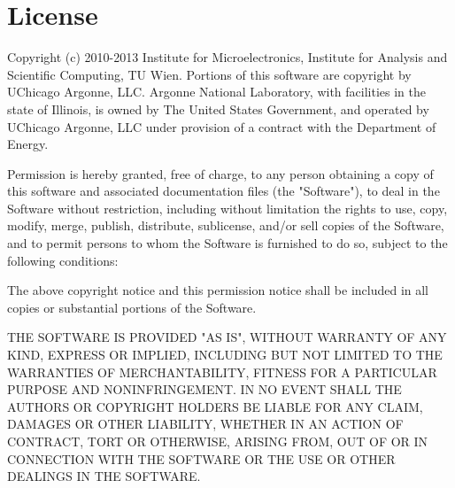 
\chapter{License} %

Copyright (c) 2010-2013 Institute for Microelectronics, Institute for Analysis and Scientific Computing, TU Wien.
Portions of this software are copyright by UChicago Argonne, LLC.
Argonne National Laboratory, with facilities in the state of Illinois,
is owned by The United States Government, and operated by UChicago Argonne, LLC
under provision of a contract with the Department of Energy.

Permission is hereby granted, free of charge, to any person obtaining a copy
of this software and associated documentation files (the "Software"), to deal
in the Software without restriction, including without limitation the rights
to use, copy, modify, merge, publish, distribute, sublicense, and/or sell
copies of the Software, and to permit persons to whom the Software is
furnished to do so, subject to the following conditions:

The above copyright notice and this permission notice shall be included in
all copies or substantial portions of the Software.

THE SOFTWARE IS PROVIDED "AS IS", WITHOUT WARRANTY OF ANY KIND, EXPRESS OR
IMPLIED, INCLUDING BUT NOT LIMITED TO THE WARRANTIES OF MERCHANTABILITY,
FITNESS FOR A PARTICULAR PURPOSE AND NONINFRINGEMENT. IN NO EVENT SHALL THE
AUTHORS OR COPYRIGHT HOLDERS BE LIABLE FOR ANY CLAIM, DAMAGES OR OTHER
LIABILITY, WHETHER IN AN ACTION OF CONTRACT, TORT OR OTHERWISE, ARISING FROM,
OUT OF OR IN CONNECTION WITH THE SOFTWARE OR THE USE OR OTHER DEALINGS IN
THE SOFTWARE.
